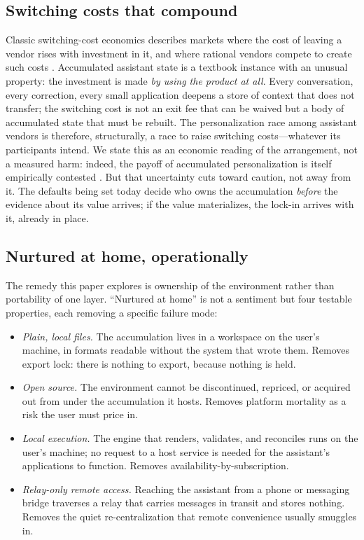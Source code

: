 \documentclass[11pt]{article}
\begin{document}
\subsection{Switching costs that compound}
\label{sec:switching}

Classic switching-cost economics describes markets where the cost of leaving a
vendor rises with investment in it, and where rational vendors compete to create
such costs \citep{klemperer,shapiro-varian}. Accumulated assistant state is a
textbook instance with an unusual property: the investment is made \emph{by using
the product at all}. Every conversation, every correction, every small
application deepens a store of context that does not transfer; the switching cost
is not an exit fee that can be waived but a body of accumulated state that must
be rebuilt. The personalization race among assistant vendors is therefore,
structurally, a race to raise switching costs---whatever its participants intend.
We state this as an economic reading of the arrangement, not a measured harm:
indeed, the payoff of accumulated personalization is itself empirically contested
\citep{recentering-humans}. But that uncertainty cuts toward caution, not away
from it. The defaults being set today decide who owns the accumulation
\emph{before} the evidence about its value arrives; if the value materializes,
the lock-in arrives with it, already in place.

\subsection{Nurtured at home, operationally}
\label{sec:home}

The remedy this paper explores is ownership of the environment rather than
portability of one layer. ``Nurtured at home'' is not a sentiment but four
testable properties, each removing a specific failure mode:

\begin{itemize}
  \item \emph{Plain, local files.} The accumulation lives in a workspace on the
  user's machine, in formats readable without the system that wrote them. Removes
  export lock: there is nothing to export, because nothing is held.
  \item \emph{Open source.} The environment cannot be discontinued, repriced, or
  acquired out from under the accumulation it hosts. Removes platform mortality
  as a risk the user must price in.
  \item \emph{Local execution.} The engine that renders, validates, and
  reconciles runs on the user's machine; no request to a host service is needed
  for the assistant's applications to function. Removes
  availability-by-subscription.
  \item \emph{Relay-only remote access.} Reaching the assistant from a phone or
  messaging bridge traverses a relay that carries messages in transit and stores
  nothing. Removes the quiet re-centralization that remote convenience usually
  smuggles in.
\end{itemize}
\end{document}
